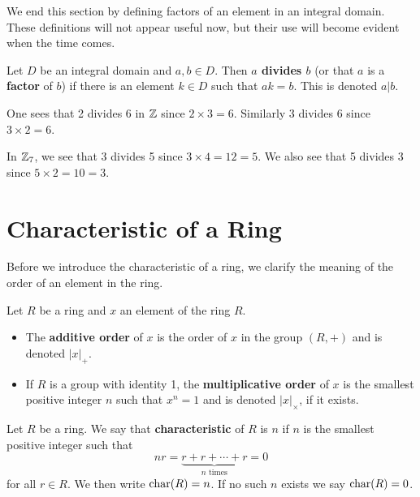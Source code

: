 We end this section by defining factors of an element in an integral domain. These definitions will not appear useful now, but their use will become evident when the time comes.

\begin{definition}
    Let $D$ be an integral domain and $a,b \in D$. Then \textbf{$a$ divides $b$} (or that $a$ is a \textbf{factor} of $b$) if there is an element $k \in D$ such that $ak = b$. This is denoted $a \vert b$.
\end{definition}
\begin{example}
    One sees that 2 divides 6 in $\mathbb{Z}$ since $2 \times 3 = 6$. Similarly 3 divides 6 since $3 \times 2 = 6$.
\end{example}
\begin{example}
    In $\mathbb{Z}_7$, we see that 3 divides 5 since $3 \times 4 = 12 = 5$. We also see that 5 divides 3 since $5 \times 2 = 10 = 3$.
\end{example}

\section{Characteristic of a Ring}
Before we introduce the characteristic of a ring, we clarify the meaning of the order of an element in the ring.
\begin{definition}
    Let $R$ be a ring and $x$ an element of the ring $R$.
    \begin{itemize}
        \item The \textbf{additive order} of $x$ is the order of $x$ in the group $(R, +)$ and is denoted $|x|_+$.
        \item If $R$ is a group with identity 1, the \textbf{multiplicative order} of $x$ is the smallest positive integer $n$ such that $x^n = 1$ and is denoted $|x|_\times$, if it exists.
    \end{itemize}
\end{definition}

\begin{definition}
    Let $R$ be a ring. We say that \textbf{characteristic} of $R$ is $n$ if $n$ is the smallest positive integer such that
    \[
        nr = \underbrace{r+r+\cdots+r}_{n \text{ times}} = 0
    \]
    for all $r \in R$. We then write $\mathrm{char}(R) = n$. If no such $n$ exists we say $\mathrm{char}(R) = 0$.
\end{definition}

